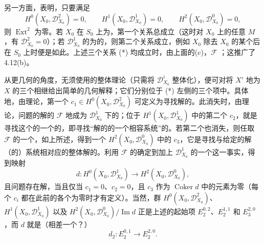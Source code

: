 另一方面，表明，只要满足
\[
H^0(X_0,\mathcal D^2_{X_0})=0,\qquad
H^1(X_0,\mathcal D^1_{X_0})=0,\qquad
H^2(X_0,\mathcal D^0_{X_0})=0,\tag{*}
\]
则 $\operatorname{Ext}^2$ 为零。若 $X_0$ 在 $S_0$ 上为，第一个关系总成立（这时对 $X_0$ 上的任意 $M$，有 $\mathcal D^2_{X_0}=0$）；若 $\mathcal D^1_{X_0}$ 的为的，则第二个关系成立，例如 $X_0$ 除去 $X_0$ 的某个后在 $S_0$ 上时便是如此。上述三个关系 (*) 均成立时，由上面的(c)，$\mathcal F$ ；这推广了4.12(b)。

从更几何的角度，无须使用的整体理论（只需将 $\mathcal D^i_{X_0}$ 整体化），便可对将 $X'$ 地为 $X$ 的三个相继给出简单的几何解释；它们分别位于 (*) 左侧的三个项中。具体地，由理论，第一个 $c_1\in H^0(X_0,\mathcal D^2_{X_0})$ 可定义为寻找解的。此消失时，由理论，问题的解的 $\mathcal F$ 地成为 $\mathcal D^1_{X_0}$ 下的；位于 $H^1(X_0,\mathcal D^1_{X_0})$ 中的第二个 $c_2$，就是寻找这个的一个的，即寻找“解的的一个相容系统”的。若第二个也消失，则任取 $\mathcal F$ 的一个，如上所述，得到一个 $H^2(X_0,\mathcal D^0_{X_0})$ 中的 $c_3$，它是寻找与给定的解（的）系统相对应的整体解的。利用 $\mathcal F$ 的确定到加上 $\mathcal D^1_{X_0}$ 的一个这一事实，得到映射
\[
d:H^0(X_0,\mathcal D^1_{X_0})\longrightarrow H^2(X_0,\mathcal D^0_{X_0}),
\]
且问题存在解，当且仅当 $c_1=0$、$c_2=0$，且 $c_3$ 作为 $\operatorname{Coker}d$ 中的元素为零（每个 $c_i$ 都在此前的各个为零时才有定义）。当然，群 $H^0(X_0,\mathcal D^2_{X_0})$、$H^1(X_0,\mathcal D^1_{X_0})$ 以及
$H^2(X_0,\mathcal D^0_{X_0})/\operatorname{Im}d$ 正是上述的起始项 $E_2^{0,2}$、$E_2^{1,1}$ 和 $E_3^{2,0}$，而 $d$ 就是（相差一个？）
\[
d_2:E_2^{0,1}\longrightarrow E_2^{2,0}.
\]
